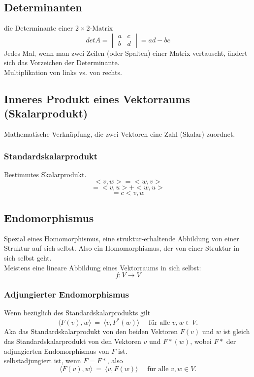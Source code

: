 \documentclass[9pt]{article} %
\begin{document}
\subsection{Determinanten}
die Determinante einer $2 \times 2$-Matrix
\begin{equation*}
    det A = 
    \begin{vmatrix}
a & c\\
b & d
\end{vmatrix} = ad - bc
\end{equation*}
Jedes Mal, wenn man zwei Zeilen (oder Spalten) einer Matrix vertauscht, ändert sich das Vorzeichen der Determinante. \\
Multiplikation von links vs. von rechts.

\subsection{Inneres Produkt eines Vektorraums (Skalarprodukt)}
 Mathematische Verknüpfung, die zwei Vektoren eine Zahl (Skalar) zuordnet. \cite{Skalarprodukt}
\subsubsection{Standardskalarprodukt}
Bestimmtes Skalarprodukt. 
\[
<v, w> = <w, v>
\]
\[<v + w, u> = <v, u> + <w, u>\]
\[<cv, w> = c<v, w\]
\cite{MathDataScience2021} 

\subsection{Endomorphismus}
Spezial eines Homomorphismus, eine struktur-erhaltende Abbildung von einer Struktur auf sich selbst. Also ein Homomorphismus, der von einer Struktur in sich selbst geht. \\
Meistens eine lineare Abbildung eines Vektorraums in sich selbst: 
\[f: V \rightarrow V\]
\subsubsection{Adjungierter Endomorphismus}
Wenn bezüglich des Standardskalarprodukts gilt
\[
\langle F(v), w\rangle \ = \ \langle v, F^* (w)\rangle \quad \text{ für alle } v,w\in V.
\]
Aka das Standardskalarprodukt von den beiden Vektoren $F(v)$ und $w$ ist gleich das Standardskalarprodukt von den Vektoren $v$ und $F*(w)$, wobei $F*$ der adjungierten Endomorphismus von $F$ ist.  \\
selbstadjungiert ist, wenn $F = F*$, also 
\[
 \langle F(v), w\rangle \ = \ \langle v, F(w)\rangle \quad \text{ für alle } v,w\in V.
\]
\cite{MathDataScience2021} 
\end{document}
